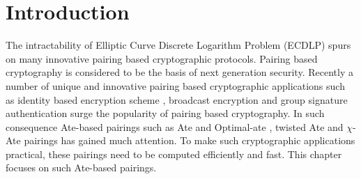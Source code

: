 \section{Introduction}
The intractability of Elliptic Curve Discrete Logarithm Problem (ECDLP) spurs on many innovative pairing based cryptographic protocols.
Pairing based cryptography is considered to be the basis of next generation security. 
Recently a number of unique and innovative pairing based cryptographic applications such as identity based encryption scheme \cite{C:BonFra01}, broadcast encryption \cite{C:BonGenWat05} and group signature authentication \cite{C:BonBoySha04} surge the popularity of pairing based cryptography. 
In such consequence Ate-based pairings such as Ate \cite{DBLP:reference/crc/2005ehcc} and Optimal-ate \cite{DBLP:journals/tit/Vercauteren10}, twisted Ate  \cite{EPRINT:MKHO07} and $\chi$-Ate \cite{PAIRING:NASKM08} pairings has gained much attention. 
To make such cryptographic applications practical, these pairings need to be computed efficiently and fast. 
This chapter focuses on such  Ate-based pairings. 

